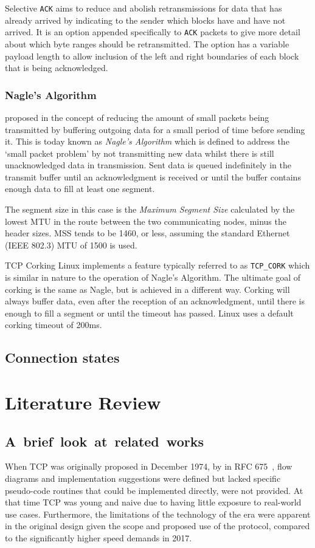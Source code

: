 \documentclass[11pt,a4paper,british]{bhamarticle}
\makeatletter
\newcounter{subsubsubsection}[subsubsection]
\newcommand\subsubsubsection{%
    \@startsection{subsubsubsection}{4}
        {\z@}{1.4\parskip}{0.2\parskip}
        {\normalfont\normalsize\bfseries}
}
\makeatother
\begin{document}
\begin{multicols}{2}
Selective \texttt{ACK} aims to reduce and abolish retransmissions for data that has already arrived by indicating to the sender which blocks have and have not arrived. It is an option appended specifically to \texttt{ACK} packets to give more detail about which byte ranges should be retransmitted. The option has a variable payload length to allow inclusion of the left and right boundaries of each block that is being acknowledged.

\subsubsection{Nagle's Algorithm}
\citeauthor{rfc896} proposed in \citeyear{rfc896} the concept of reducing the amount of small packets being transmitted by buffering outgoing data for a small period of time before sending it. This is today known as \textit{Nagle's Algorithm} which is defined to address the `small packet problem' by not transmitting new data whilst there is still unacknowledged data in transmission. Sent data is queued indefinitely in the transmit buffer until an acknowledgment is received or until the buffer contains enough data to fill at least one segment.

The segment size in this case is the \textit{Maximum Segment Size} calculated by the lowest MTU in the route between the two communicating nodes, minus the header sizes. MSS tends to be 1460, or less, assuming the standard Ethernet (IEEE 802.3) MTU of 1500 is used.

\subsubsubsection{TCP Corking}
Linux implements a feature typically referred to as \texttt{TCP\_CORK} which is similar in nature to the operation of Nagle's Algorithm. The ultimate goal of corking is the same as Nagle, but is achieved in a different way. Corking will always buffer data, even after the reception of an acknowledgment, until there is enough to fill a segment or until the timeout has passed.  Linux uses a default corking timeout of 200ms.

\subsection{Connection states}

\section{Literature Review}
\subsection{\mbox{A brief look at related works}}
When TCP was originally proposed in December 1974, by \citeauthor{rfc675} in RFC 675~\cite{rfc675}, flow diagrams and implementation suggestions were defined but lacked specific pseudo-code routines that could be implemented directly, were not provided. At that time TCP was young and naive due to having little exposure to real-world use cases. Furthermore, the limitations of the technology of the era were apparent in the original design given the scope and proposed use of the protocol, compared to the significantly higher speed demands in 2017.


\end{multicols}
\end{document}
